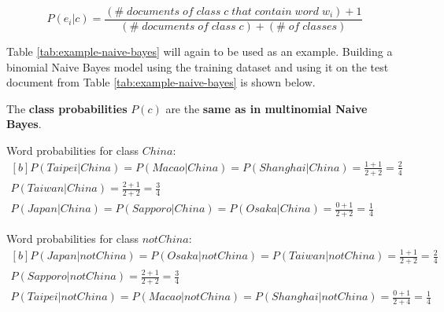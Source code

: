 \documentclass{article}
\begin{document}
\begin{equation}
	P(e_i|c) = \frac{(\#\;documents\;of\;class\;c\;that\;contain\;word\;w_i) + 1}{(\#\;documents\;of\;class\;c) + (\#\;of\;classes)}	
	\label{eq:binomial-word-existence-prob}
\end{equation}

Table \ref{tab:example-naive-bayes} will again to be used as an example. Building a binomial Naive Bayes model using the training dataset and using it on the test document from Table \ref{tab:example-naive-bayes} is shown below.

The \textbf{class probabilities} $P(c)$ are the \textbf{same as in multinomial Naive Bayes}.

Word probabilities for class $China$:
\begin{equation}
\begin{aligned}[b]
P(Taipei|China) = P(Macao|China) = P(Shanghai|China) = \frac{1 + 1}{2 + 2} = \frac{2}{4} \\
P(Taiwan|China) = \frac{2 + 1}{2 + 2} = \frac{3}{4} \\
P(Japan|China) = P(Sapporo|China) = P(Osaka|China) = \frac{0 + 1}{2 + 2} = \frac{1}{4}
\end{aligned}
\end{equation}

Word probabilities for class $notChina$:
\begin{equation}
\begin{aligned}[b]
P(Japan|notChina) = P(Osaka|notChina) = P(Taiwan|notChina) = \frac{1 + 1}{2 + 2} = \frac{2}{4} \\
P(Sapporo|notChina) = \frac{2 + 1}{2 + 2} = \frac{3}{4} \\
P(Taipei|notChina) = P(Macao|notChina) = P(Shanghai|notChina) = \frac{0 + 1}{2 + 4} = \frac{1}{4}
\end{aligned}
\end{equation}
\end{document}
